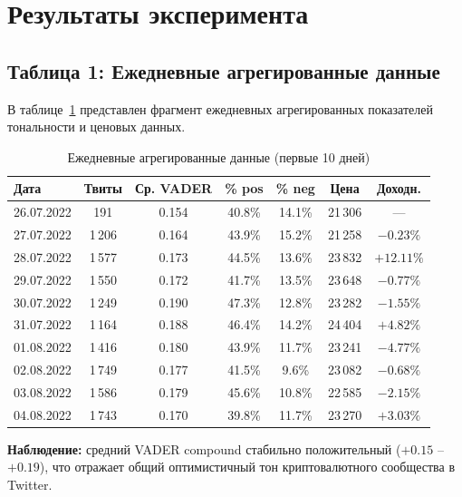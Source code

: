 \documentclass[a4paper,12pt]{article}
\begin{document}

\section{Результаты эксперимента}

\subsection{Таблица 1: Ежедневные агрегированные данные}

В таблице~\ref{tab:daily} представлен фрагмент ежедневных агрегированных показателей
тональности и ценовых данных.

\begin{table}[H]
\centering
\caption{Ежедневные агрегированные данные (первые 10 дней)}
\label{tab:daily}
\small
\begin{tabular}{|l|c|c|c|c|c|c|}
\hline
\textbf{Дата} & \textbf{Твиты} & \textbf{Ср. VADER} & \textbf{\% pos} & \textbf{\% neg} & \textbf{Цена} & \textbf{Доходн.} \\
\hline
26.07.2022 & 191 & 0.154 & 40.8\% & 14.1\% & 21\,306 & --- \\
27.07.2022 & 1\,206 & 0.164 & 43.9\% & 15.2\% & 21\,258 & $-0.23\%$ \\
28.07.2022 & 1\,577 & 0.173 & 44.5\% & 13.6\% & 23\,832 & $+12.11\%$ \\
29.07.2022 & 1\,550 & 0.172 & 41.7\% & 13.5\% & 23\,648 & $-0.77\%$ \\
30.07.2022 & 1\,249 & 0.190 & 47.3\% & 12.8\% & 23\,282 & $-1.55\%$ \\
31.07.2022 & 1\,164 & 0.188 & 46.4\% & 14.2\% & 24\,404 & $+4.82\%$ \\
01.08.2022 & 1\,416 & 0.180 & 43.9\% & 11.7\% & 23\,241 & $-4.77\%$ \\
02.08.2022 & 1\,749 & 0.177 & 41.5\% & 9.6\% & 23\,082 & $-0.68\%$ \\
03.08.2022 & 1\,586 & 0.179 & 45.6\% & 10.8\% & 22\,585 & $-2.15\%$ \\
04.08.2022 & 1\,743 & 0.170 & 39.8\% & 11.7\% & 23\,270 & $+3.03\%$ \\
\hline
\end{tabular}
\end{table}

\textbf{Наблюдение:} средний VADER compound стабильно положительный ($+0.15$ -- $+0.19$),
что отражает общий оптимистичный тон криптовалютного сообщества в Twitter.
\end{document}
